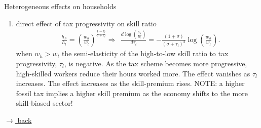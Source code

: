\documentclass[11pt,aspectratio=169]{beamer}
\begin{document}
\begin{frame}{Heterogeneous effects on households}
		\hypertarget{skillr}{}
	\begin{enumerate}
		\item direct effect of tax progressivity on skill ratio\begin{align*}
		&\frac{h_h}{h_l}=\left(\frac{w_h}{w_l}\right)^\frac{1-\tau_l}{\sigma+\tau_l}
		\Rightarrow\ \  \frac{d\log(\frac{h_h}{h_l})}{d \tau_l}
		= - \frac{(1+\sigma)}{(\sigma+\tau_l)^2}\log\left(\frac{w_h}{w_l}\right).
		\end{align*}
		when $w_h>w_l$ the semi-elasticity of the high-to-low skill ratio to tax progressivity, $\tau_l$, is negative. As the tax scheme becomes more progressive, high-skilled workers reduce their hours worked more. The effect vanishes as $\tau_l$ increases. The effect increases as the skill-premium rises. NOTE: a higher fossil tax implies a higher skill premium as the economy shifts to the more skill-biased sector!
	\end{enumerate}
\vspace{0mm}
\hfill
\hyperlink{backhh}{\tiny{$\rightarrow$ back}}
\end{frame}
\end{document}
